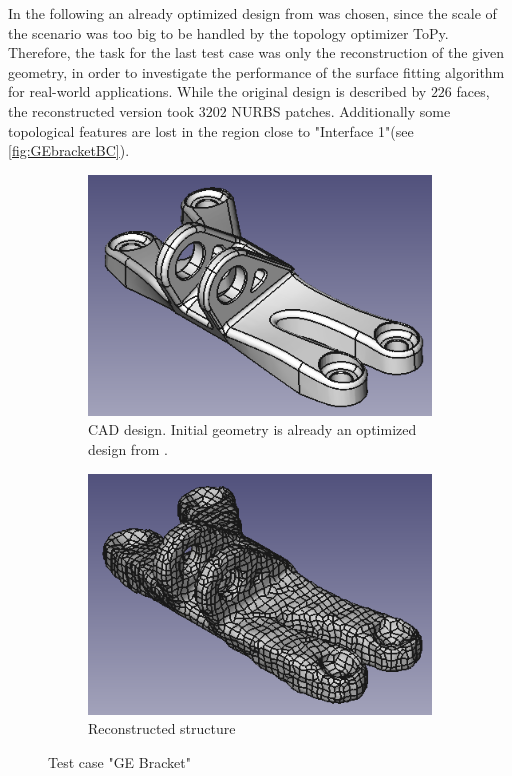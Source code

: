 In the following an already optimized design from \cite{GEBracketTripon} was chosen, since the scale of the scenario was too big to be handled by the topology optimizer ToPy. Therefore, the task for the last test case was only the reconstruction of the given geometry, in order to investigate the performance of the surface fitting algorithm for real-world applications. While the original design is described by $226$ faces, the reconstructed version took $3202$ NURBS patches. Additionally some topological features are lost in the region close to "Interface 1"(see \autoref{fig:GEbracketBC}).
\enlargethispage{2cm}
\begin{figure}[H]
\begin{subfigure}[t]{.45\textwidth}
\begin{center}
\includegraphics[width=.9\textwidth]{Pictures/Results/BracketIn.png}
\end{center}
\caption{CAD design. Initial geometry is already an optimized design from \cite{GEBracketTripon}.}
\label{fig:GEbracketCAD}
\end{subfigure}
\begin{subfigure}[t]{.45\textwidth}
\begin{center}
\includegraphics[width=.9\textwidth]{Pictures/Results/BracketOut.png}
\end{center}
\caption{Reconstructed structure}
\label{fig:GEbracketOPTIM}
\end{subfigure}
\caption{Test case "GE Bracket"}
\end{figure}

